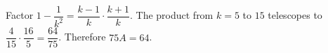 Factor $1-\dfrac{1}{k^2}=\dfrac{k-1}{k}\cdot\dfrac{k+1}{k}$. The product from $k=5$ to $15$ telescopes to $\dfrac{4}{15}\cdot\dfrac{16}{5}=\dfrac{64}{75}$. Therefore $\boxed{75A=64}$.
